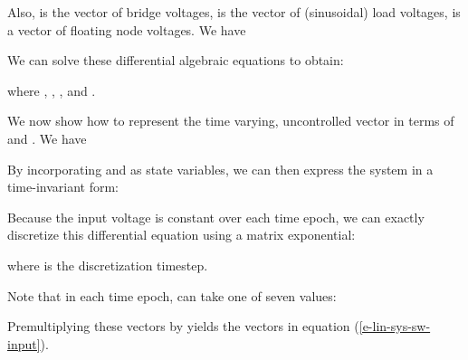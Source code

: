 \documentclass[12pt]{article}
\begin{document}
Also,  is the vector of bridge voltages,
 is the vector of (sinusoidal) load voltages,
 is a vector of floating node voltages.
We have


We can solve these differential algebraic equations to obtain:

where 
, 
,
,
and .



We now show how to represent the time varying, uncontrolled vector
 in terms of  and .
We have

By incorporating  and  as state variables,
we can then express the system in a time-invariant form:

Because the input voltage is constant over each time epoch,
we can exactly discretize this differential equation using a matrix exponential:

where  is the discretization timestep.

Note that in each time epoch,
 can take one of seven values:

Premultiplying these vectors by  yields
the vectors  in equation 
(\ref{e-lin-sys-sw-input}).
\end{document}
